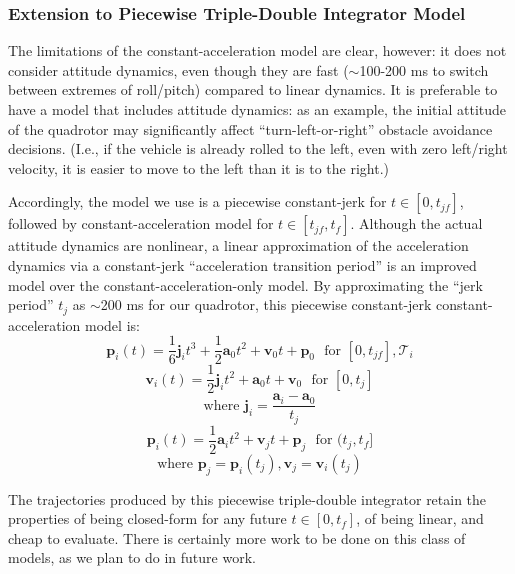 \documentclass{llncs}
\begin{document}
\subsubsection{Extension to Piecewise Triple-Double Integrator Model}

The limitations of the constant-acceleration model are clear, however: it does not consider attitude dynamics, even though they are fast ($\sim$100-200 ms to switch between extremes of roll/pitch) compared to linear dynamics.  It is preferable to have a model that includes attitude dynamics:  as an example, the initial attitude of the quadrotor may significantly affect ``turn-left-or-right'' obstacle avoidance decisions.  (I.e., if the vehicle is already rolled to the left, even with zero left/right velocity, it is easier to move to the left than it is to the right.)

Accordingly, the model we use is a piecewise constant-jerk for $t \in [0,t_{jf}]$, followed by constant-acceleration model for $t \in [t_{jf},t_f]$.  Although the actual attitude dynamics are nonlinear, a linear approximation of the acceleration dynamics via a constant-jerk ``acceleration transition period'' is an improved model over the constant-acceleration-only model.  By approximating the ``jerk period'' $t_j$ as $\sim$200 ms for our quadrotor, this piecewise constant-jerk constant-acceleration model is:
%
\begin{equation}
\textbf{p}_i(t) = \frac{1}{6} \textbf{j}_i t^3 + \frac{1}{2} \textbf{a}_0 t^2 + \mathbf{v}_0 t + \textbf{p}_0 \ \ \ \text{for } [0,t_{jf}], \mathcal{T}_i
\end{equation}
\begin{equation}
\mathbf{v}_i(t)  = \frac{1}{2}\textbf{j}_i t^2 +  \textbf{a}_0 t + \mathbf{v}_0 \ \ \ \text{for } [0,t_j]
\end{equation}
\begin{equation}
\text{where } \textbf{j}_i = \frac{\textbf{a}_i - \textbf{a}_0}{t_j} 
\end{equation}
\begin{equation}
\textbf{p}_i(t) = \frac{1}{2} \textbf{a}_i t^2 + \mathbf{v}_j t + \textbf{p}_j \ \ \ \text{for } (t_j,t_f]
\end{equation}
\begin{equation}
\text{where } \textbf{p}_j = \textbf{p}_i(t_j),   \textbf{v}_j = \textbf{v}_i(t_j)
\end{equation}

%
The trajectories produced by this piecewise triple-double integrator retain the properties of being closed-form for any future $t \in [0, t_f]$, of being linear, and cheap to evaluate.  There is certainly more work to be done on this class of models, as we plan to do in future work.  %
\end{document}
